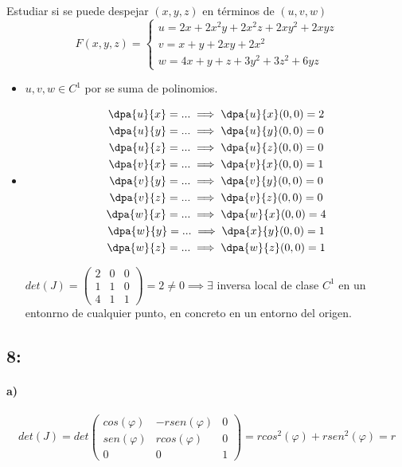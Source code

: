 \documentclass{apuntes}
\begin{document}
\begin{problem}[6]
Estudiar si se puede despejar $(x,y,z)$ en términos de $(u,v,w)$ 
$$F(x,y,z) = \left\{\begin{matrix}u = 2x+2x^2y+2x^2z+2xy^2+2xyz\\v=x+y+2xy+2x^2\\w=4x+y+z+3y^2+3z^2+6yz\end{matrix}\right.$$
\solution
\begin{itemize}
 \item $u,v,w \in C^1$ por se suma de polinomios. 
 \item \begin{gather*}
\dpa{u}{x} = ... \implies \dpa{u}{x}(0,0) = 2\\
\dpa{u}{y} = ... \implies \dpa{u}{y}(0,0) = 0\\
\dpa{u}{z} = ... \implies \dpa{u}{z}(0,0) = 0\\
\dpa{v}{x} = ... \implies \dpa{v}{x}(0,0) = 1\\
\dpa{v}{y} = ... \implies \dpa{v}{y}(0,0) = 0\\
\dpa{v}{z} = ... \implies \dpa{v}{z}(0,0) = 0\\
\dpa{w}{x} = ... \implies \dpa{w}{x}(0,0) = 4\\
\dpa{w}{y} = ... \implies \dpa{x}{y}(0,0) = 1\\
\dpa{w}{z} = ... \implies \dpa{w}{z}(0,0) = 1
       \end{gather*}
       
   $det(J) =\begin{pmatrix}
             2&0&0\\
             1&1&0\\
             4&1&1
            \end{pmatrix}
 = 2 \neq 0 \implies \exists $ inversa local de clase $C^1$ en un entonrno de cualquier punto, en concreto en un entorno del origen.
\end{itemize}
\end{problem}

\subsection{8:}
\paragraph{a)}

$$det(J) = det\begin{pmatrix}
       cos(\varphi)&-rsen(\varphi)&0\\
       sen(\varphi)&rcos(\varphi)&0\\
       0&0&1
      \end{pmatrix} = rcos^2(\varphi) + rsen^2(\varphi) = r$$
      
\end{document}
